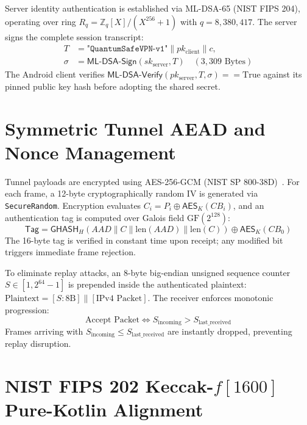 Server identity authentication is established via ML-DSA-65 (NIST FIPS 204), operating over ring $R_q = \mathbb{Z}_q[X]/(X^{256} + 1)$ with $q = 8,380,417$. The server signs the complete session transcript:
\begin{equation}
\begin{split}
T & = \texttt{"QuantumSafeVPN-v1"} \parallel pk_{\text{client}} \parallel c, \\
\sigma & = \mathsf{ML}\text{-}\mathsf{DSA}\text{-}\mathsf{Sign}(sk_{\text{server}}, T) \quad (3,309\text{ Bytes})
\end{split}
\end{equation}
The Android client verifies $\mathsf{ML}\text{-}\mathsf{DSA}\text{-}\mathsf{Verify}(pk_{\text{server}}, T, \sigma) == \text{True}$ against its pinned public key hash before adopting the shared secret.

\section{Symmetric Tunnel AEAD and Nonce Management}
\label{sec:symmetric_tunnel_aead}

Tunnel payloads are encrypted using AES-256-GCM (NIST SP 800-38D)~\cite{nist_sp_800_175b}. For each frame, a 12-byte cryptographically random IV is generated via \texttt{SecureRandom}. Encryption evaluates $C_i = P_i \oplus \mathsf{AES}_K(CB_i)$, and an authentication tag is computed over Galois field $\text{GF}(2^{128})$:
\begin{equation}
\mathsf{Tag} = \mathsf{GHASH}_H(AAD \parallel C \parallel \text{len}(AAD) \parallel \text{len}(C)) \oplus \mathsf{AES}_K(CB_0)
\end{equation}
The 16-byte tag is verified in constant time upon receipt; any modified bit triggers immediate frame rejection.

To eliminate replay attacks, an 8-byte big-endian unsigned sequence counter $S \in [1, 2^{64}-1]$ is prepended inside the authenticated plaintext: $\text{Plaintext} = [S : 8\text{B}] \parallel [\text{IPv4 Packet}]$. The receiver enforces monotonic progression:
\begin{equation}
\text{Accept Packet} \iff S_{\text{incoming}} > S_{\text{last\_received}}
\end{equation}
Frames arriving with $S_{\text{incoming}} \le S_{\text{last\_received}}$ are instantly dropped, preventing replay disruption.

\section{NIST FIPS 202 Keccak-$f[1600]$ Pure-Kotlin Alignment}
\label{sec:keccak_alignment}

